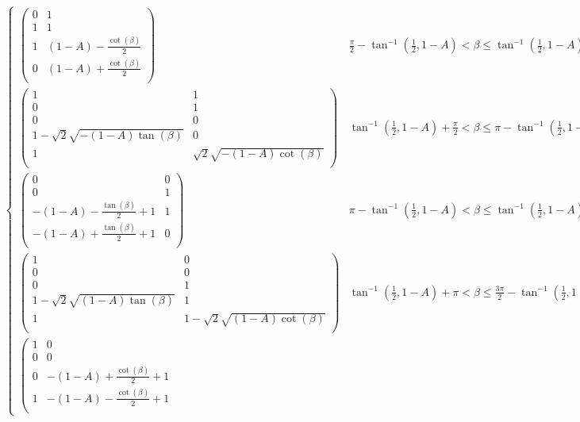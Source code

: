 \begin{table*}
\begin{align}
\begin{cases}
 \left(
\begin{array}{cc}
 0 & 1 \\
 1 & 1 \\
 1 & (1-A)-\frac{\cot (\beta )}{2} \\
 0 & (1-A)+\frac{\cot (\beta )}{2} \\
\end{array}
\right) & \frac{\pi }{2}-\tan ^{-1}\left(\frac{1}{2},1-A\right)<\beta \leq \tan ^{-1}\left(\frac{1}{2},1-A\right)+\frac{\pi }{2} \\
 \left(
\begin{array}{cc}
 1 & 1 \\
 0 & 1 \\
 0 & 0 \\
 1-\sqrt{2} \sqrt{-(1-A) \tan (\beta )} & 0 \\
 1 & \sqrt{2} \sqrt{-(1-A) \cot (\beta )} \\
\end{array}
\right) & \tan ^{-1}\left(\frac{1}{2},1-A\right)+\frac{\pi }{2}<\beta \leq \pi -\tan ^{-1}\left(\frac{1}{2},1-A\right) \\
 \left(
\begin{array}{cc}
 0 & 0 \\
 0 & 1 \\
 -(1-A)-\frac{\tan (\beta )}{2}+1 & 1 \\
 -(1-A)+\frac{\tan (\beta )}{2}+1 & 0 \\
\end{array}
\right) & \pi -\tan ^{-1}\left(\frac{1}{2},1-A\right)<\beta \leq \tan ^{-1}\left(\frac{1}{2},1-A\right)+\pi  \\
 \left(
\begin{array}{cc}
 1 & 0 \\
 0 & 0 \\
 0 & 1 \\
 1-\sqrt{2} \sqrt{(1-A) \tan (\beta )} & 1 \\
 1 & 1-\sqrt{2} \sqrt{(1-A) \cot (\beta )} \\
\end{array}
\right) & \tan ^{-1}\left(\frac{1}{2},1-A\right)+\pi <\beta \leq \frac{3 \pi }{2}-\tan ^{-1}\left(\frac{1}{2},1-A\right) \\
 \left(
\begin{array}{cc}
 1 & 0 \\
 0 & 0 \\
 0 & -(1-A)+\frac{\cot (\beta )}{2}+1 \\
 1 & -(1-A)-\frac{\cot (\beta )}{2}+1 \\

\end{array}
\end{cases}
\end{align}
\end{table*}
